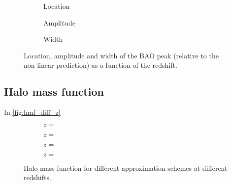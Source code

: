 \begin{figure}
\newcommand{\corrwidth}{0.70}
\centering
	\begin{subfigure}{\corrwidth\textwidth}
	\end{subfigure}
	\begin{subfigure}{\corrwidth\textwidth}
		\centering
		\caption{Location}
	\end{subfigure}
	\begin{subfigure}{\corrwidth\textwidth}
		\centering
		\caption{Amplitude}
	\end{subfigure}
	\begin{subfigure}{\corrwidth\textwidth}
		\centering
		\caption{Width}
	\end{subfigure}
	\caption{Location, amplitude and width of the BAO peak (relative to the non-linear prediction) as a function of the redshift.}
	\label{fig:corr_peak}
\end{figure}

\subsection{Halo mass function}
In \autoref{fig:hmf_diff_z}
\begin{figure*}
	\centering
		\begin{subfigure}{1.0\textwidth}
		\end{subfigure}
		\begin{subfigure}{0.5\textwidth}
			\caption{$z = $}
		\end{subfigure}%
		\begin{subfigure}{0.5\textwidth}
			\caption{$z = $}
		\end{subfigure}
		\begin{subfigure}{0.5\textwidth}
			\caption{$z = $}
		\end{subfigure}%
		\begin{subfigure}{0.5\textwidth}
			\caption{$z = $}
		\end{subfigure}
		\caption{Halo mass function for different approximation schemes at different redshifts.}
		\label{fig:hmf_diff_z}
	\end{figure*}


